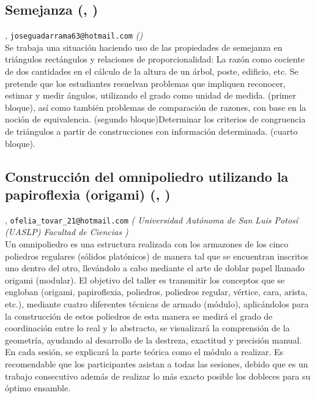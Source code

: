 \subsection{\sffamily Semejanza {\footnotesize (, )}} \label{reg-1885} 
, {\tt joseguadarrama63@hotmail.com}  {\slshape ()}\\
          \noindent Se trabaja una situación haciendo uso de las propiedades de semejanza en triángulos rectángulos y relaciones de proporcionalidad: La razón como cociente de dos cantidades en el cálculo de la altura de un árbol, poste, edificio, etc. Se pretende que los estudiantes resuelvan problemas que impliquen reconocer, estimar y medir ángulos, utilizando el grado como unidad de medida. (primer bloque), así como también problemas de comparación de razones, con base en la noción de equivalencia. (segundo bloque)Determinar los criterios de congruencia de triángulos a partir de construcciones con información determinada. (cuarto bloque).
\subsection{\sffamily Construcción del omnipoliedro utilizando la papiroflexia (origami) {\footnotesize (, )}} \label{reg-1442} 
, {\tt ofelia_tovar_21@hotmail.com}  {\slshape ( Universidad Autónoma de San Luis Potosí (UASLP)  Facultad de Ciencias )}\\
          \noindent Un omnipoliedro es una estructura realizada con los armazones de los cinco poliedros regulares (sólidos platónicos) de manera tal que se encuentran inscritos uno dentro del otro, llevándolo a cabo mediante el arte de doblar papel llamado origami (modular). El objetivo del taller es transmitir los conceptos que se engloban (origami, papiroflexia, poliedros, poliedros regular, vértice, cara, arista, etc.),  mediante cuatro diferentes técnicas de armado (módulo), aplicándolos para la construcción de estos poliedros de esta manera se medirá el grado de coordinación entre lo real y lo abstracto, se visualizará la comprensión de la geometría, ayudando al desarrollo de la destreza, exactitud y precisión manual. En cada sesión, se explicará la parte teórica como el módulo a realizar. Es recomendable que los participantes asistan a todas las sesiones, debido que es un trabajo consecutivo además de realizar lo más exacto posible los dobleces para su óptimo ensamble.

